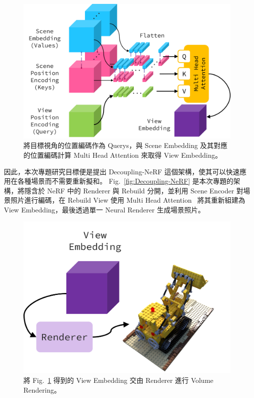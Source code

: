 \documentclass[10pt,twocolumn,letterpaper]{article}
\begin{document}
\begin{CJK}{UTF8}{bkai}
   \begin{figure}
      \begin{center}
         \includegraphics[width=1\linewidth]{img/rebuild-view.png}
      \end{center}
      \caption{
         將目標視角的位置編碼作為 Querys，與 Scene Embedding 及其對應的位置編碼計算
         Multi Head Attention 來取得 View Embedding。
      }
      \label{fig:rebuild-view}
   \end{figure}

   因此，本次專題研究目標便是提出 Decoupling-NeRF 這個架構，使其可以快速應用在各種場景而不需要重新擬和。
   Fig.~\ref{fig:Decoupling-NeRF} 是本次專題的架構，將隱含於 NeRF
   中的 Renderer 與 Rebuild 分開，並利用 Scene Encoder
   對場景照片進行編碼，在 Rebuild View 使用 Multi Head Attention~\cite{AttentionIsAllYouNeed}
   將其重新組建為 View Embedding，最後透過單一 Neural Renderer 生成場景照片。

   \begin{figure}[htbp]
      \begin{center}
         \includegraphics[width=1\linewidth]{img/render-view.png}
      \end{center}
      \caption{
         將 Fig.~\ref{fig:rebuild-view} 得到的 View Embedding 交由
         Renderer 進行 Volume Rendering。
      }
      \label{fig:render-view}
   \end{figure}


\end{CJK}
\end{document}
